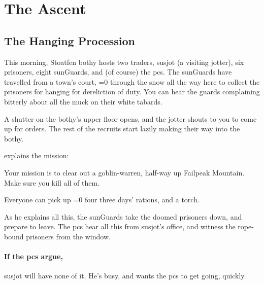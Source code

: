 \section{The Ascent}
\label{goblinsBegin}


\begin{multicols}{2}
\renewcommand\npcsymbol{\glsfmttext{afternoon}}

\subsection[The Hanging Procession]{The Hanging Procession}

\begin{boxtext}
  This morning, Stoatfen \gls{bothy} hosts two traders, \gls{susjot} (a visiting \gls{jotter}), six prisoners, eight \glspl{sunGuard}, and (of course) the \glspl{pc}.
  The \glspl{sunGuard} have travelled from a town's \gls{court},
  \ifnum\value{temperature}=0%
    through the \gls{snow}
  \else
    all the way here
  \fi%
  to collect the prisoners for hanging for dereliction of duty.
  You can hear the guards complaining bitterly about all the muck on their white tabards.

  A shutter on the \gls{bothy}'s upper floor opens, and the \gls{jotter} shouts to you to come up for orders.
  The rest of the recruits start lazily making their way into the \gls{bothy}.
\end{boxtext}

 explains the mission:

\begin{exampletext}
  Your mission is to clear out a goblin-warren, half-way up Failpeak Mountain.
  Make sure you kill all of them.

  Everyone can pick up \ifnum\value{temperature}=0 four \else three \fi days' \glspl{ration}, and a torch.
\end{exampletext}

\noindent
As he explains all this, the \glspl{sunGuard} take the doomed prisoners down, and prepare to leave.
The \glspl{pc} hear all this from \gls{susjot}'s office, and witness the rope-bound prisoners from the window.

\paragraph{If the \glspl{pc} argue,}
\gls{susjot} will have none of it.
He's busy, and wants the \glspl{pc} to get going, quickly.


\end{multicols}
